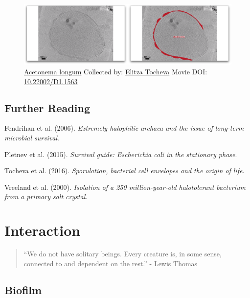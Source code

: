 \documentclass[]{tufte-book}
\begin{document}
\begin{figure}
\includegraphics{movie_stills/8_11} \caption[\protect\hyperlink{tree}{Acetonema longum} Collected by:
\protect\hyperlink{elitza_tocheva}{Elitza Tocheva} Movie DOI:
\href{https://doi.org/10.22002/D1.1563}{10.22002/D1.1563}]{\protect\hyperlink{tree}{Acetonema longum} Collected by:
\protect\hyperlink{elitza_tocheva}{Elitza Tocheva} Movie DOI:
\href{https://doi.org/10.22002/D1.1563}{10.22002/D1.1563}}\label{fig:8-11}
\end{figure}

\section{Further Reading}\label{further-reading}

Fendrihan et al. (2006). \emph{Extremely halophilic archaea and the
issue of long-term microbial survival}.\citep{fendrihan2006}

Pletnev et al. (2015). \emph{Survival guide: Escherichia coli in the
stationary phase}.\citep{pletnev2015}

Tocheva et al. (2016). \emph{Sporulation, bacterial cell envelopes and
the origin of life}.\citep{tocheva2016}

Vreeland et al. (2000). \emph{Isolation of a 250 million-year-old
halotolerant bacterium from a primary salt crystal}.\citep{vreeland2000}

\chapter{Interaction}\label{interaction}

\begin{quote}
``We do not have solitary beings. Every creature is, in some sense,
connected to and dependent on the rest.'' - Lewis Thomas
\citep{thomas1974}
\end{quote}

\section{Biofilm}\label{biofilm}
\end{document}
